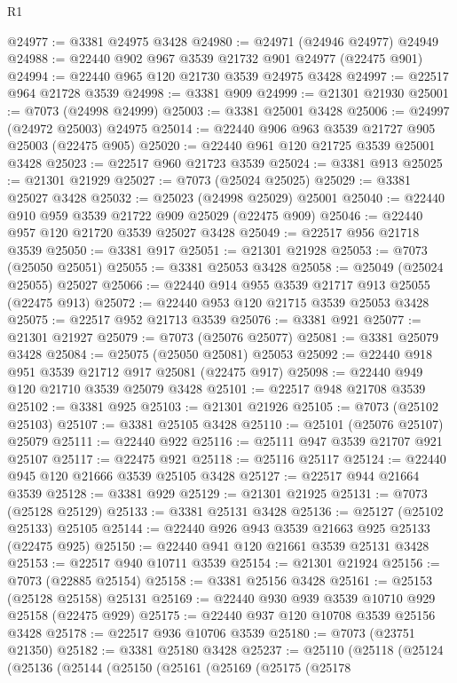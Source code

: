 \begin{lexlean}{R1}
\begin{coremodule}
@24977 := @3381 @24975 @3428
@24980 := @24971 (@24946 @24977) @24949
@24988 := @22440 @902 @967 @3539 @21732 @901 @24977 (@22475 @901)
@24994 := @22440 @965 @120 @21730 @3539 @24975 @3428
@24997 := @22517 @964 @21728 @3539
@24998 := @3381 @909
@24999 := @21301 @21930
@25001 := @7073 (@24998 @24999)
@25003 := @3381 @25001 @3428
@25006 := @24997 (@24972 @25003) @24975
@25014 := @22440 @906 @963 @3539 @21727 @905 @25003 (@22475 @905)
@25020 := @22440 @961 @120 @21725 @3539 @25001 @3428
@25023 := @22517 @960 @21723 @3539
@25024 := @3381 @913
@25025 := @21301 @21929
@25027 := @7073 (@25024 @25025)
@25029 := @3381 @25027 @3428
@25032 := @25023 (@24998 @25029) @25001
@25040 := @22440 @910 @959 @3539 @21722 @909 @25029 (@22475 @909)
@25046 := @22440 @957 @120 @21720 @3539 @25027 @3428
@25049 := @22517 @956 @21718 @3539
@25050 := @3381 @917
@25051 := @21301 @21928
@25053 := @7073 (@25050 @25051)
@25055 := @3381 @25053 @3428
@25058 := @25049 (@25024 @25055) @25027
@25066 := @22440 @914 @955 @3539 @21717 @913 @25055 (@22475 @913)
@25072 := @22440 @953 @120 @21715 @3539 @25053 @3428
@25075 := @22517 @952 @21713 @3539
@25076 := @3381 @921
@25077 := @21301 @21927
@25079 := @7073 (@25076 @25077)
@25081 := @3381 @25079 @3428
@25084 := @25075 (@25050 @25081) @25053
@25092 := @22440 @918 @951 @3539 @21712 @917 @25081 (@22475 @917)
@25098 := @22440 @949 @120 @21710 @3539 @25079 @3428
@25101 := @22517 @948 @21708 @3539
@25102 := @3381 @925
@25103 := @21301 @21926
@25105 := @7073 (@25102 @25103)
@25107 := @3381 @25105 @3428
@25110 := @25101 (@25076 @25107) @25079
@25111 := @22440 @922
@25116 := @25111 @947 @3539 @21707 @921 @25107
@25117 := @22475 @921
@25118 := @25116 @25117
@25124 := @22440 @945 @120 @21666 @3539 @25105 @3428
@25127 := @22517 @944 @21664 @3539
@25128 := @3381 @929
@25129 := @21301 @21925
@25131 := @7073 (@25128 @25129)
@25133 := @3381 @25131 @3428
@25136 := @25127 (@25102 @25133) @25105
@25144 := @22440 @926 @943 @3539 @21663 @925 @25133 (@22475 @925)
@25150 := @22440 @941 @120 @21661 @3539 @25131 @3428
@25153 := @22517 @940 @10711 @3539
@25154 := @21301 @21924
@25156 := @7073 (@22885 @25154)
@25158 := @3381 @25156 @3428
@25161 := @25153 (@25128 @25158) @25131
@25169 := @22440 @930 @939 @3539 @10710 @929 @25158 (@22475 @929)
@25175 := @22440 @937 @120 @10708 @3539 @25156 @3428
@25178 := @22517 @936 @10706 @3539
@25180 := @7073 (@23751 @21350)
@25182 := @3381 @25180 @3428
@25237 := @25110
    (@25118
      (@25124
        (@25136
          (@25144
            (@25150
              (@25161
                (@25169
                  (@25175
                    (@25178

\end{coremodule}
\end{lexlean}

